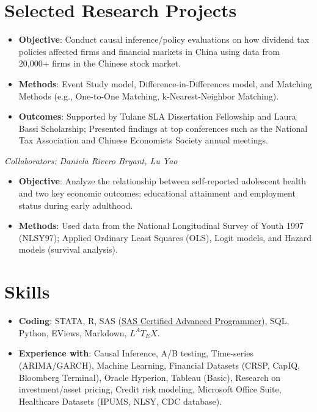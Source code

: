 \documentclass{resume}
\begin{document}
\section{Selected Research Projects}

\begin{itemize}
    \item \textbf{Objective}: Conduct causal inference/policy evaluations on how dividend tax policies affected firms and financial markets in China using data from 20,000+ firms in the Chinese stock market.
    \item \textbf{Methods}: Event Study model, Difference-in-Differences model, and Matching Methods (e.g., One-to-One Matching, k-Nearest-Neighbor Matching).
    \item \textbf{Outcomes}: Supported by Tulane SLA Dissertation Fellowship and Laura Bassi Scholarship; Presented findings at top conferences such as the National Tax Association and Chinese Economists Society annual meetings.
\end{itemize}

\textit{Collaborators: Daniela Rivero Bryant, Lu Yao}  
\begin{itemize}
    \item \textbf{Objective}: Analyze the relationship between self-reported adolescent health and two key economic outcomes: educational attainment and employment status during early adulthood.
    \item \textbf{Methods}: Used data from the National Longitudinal Survey of Youth 1997 (NLSY97); Applied Ordinary Least Squares (OLS), Logit models, and Hazard models (survival analysis).
\end{itemize}

\section{Skills}
\begin{itemize}[parsep=0.25ex]
    \item \textbf{Coding}: STATA, R, SAS (\href{https://www.youracclaim.com/badges/c4bce10e-7398-4203-9d11-f9c6723749a4/linked_in_profile}{SAS Certified Advanced Programmer}), SQL, Python, EViews, Markdown, $L^{A}T_{E}X$.
    \item \textbf{Experience with}: Causal Inference, A/B testing, Time-series (ARIMA/GARCH), Machine Learning, Financial Datasets (CRSP, CapIQ, Bloomberg Terminal), Oracle Hyperion, Tableau (Basic), Research on investment/asset pricing, Credit risk modeling, Microsoft Office Suite, Healthcare Datasets (IPUMS, NLSY, CDC database).
\end{itemize}
\end{document}
